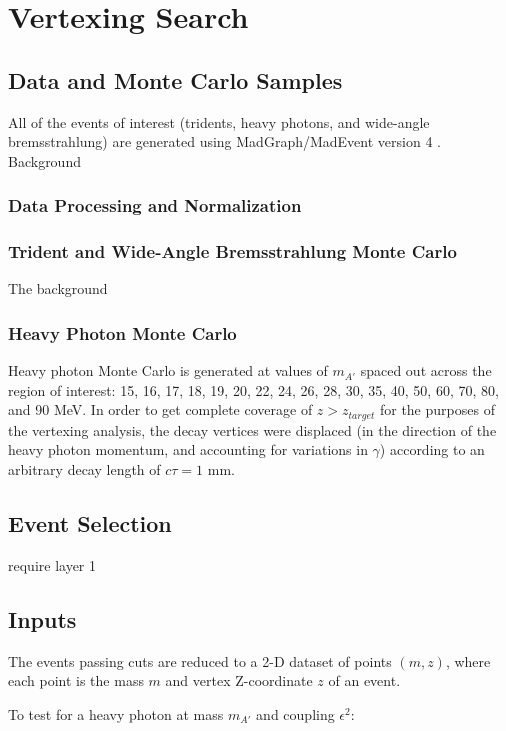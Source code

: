 \chapter{Vertexing Search}

\section{Data and Monte Carlo Samples}
All of the events of interest (tridents, heavy photons, and wide-angle bremsstrahlung) are generated using MadGraph/MadEvent version 4 \cite{alwall_madgraph_2007}.
Background

\subsection{Data Processing and Normalization}

\subsection{Trident and Wide-Angle Bremsstrahlung Monte Carlo}
The background 

\subsection{Heavy Photon Monte Carlo}
\label{sec:ap_mc}
Heavy photon Monte Carlo is generated at values of $m_{A'}$ spaced out across the region of interest: 15, 16, 17, 18, 19, 20, 22, 24, 26, 28, 30, 35, 40, 50, 60, 70, 80, and 90 MeV.
In order to get complete coverage of $z>z_{target}$ for the purposes of the vertexing analysis, the decay vertices were displaced (in the direction of the heavy photon momentum, and accounting for variations in $\gamma$) according to an arbitrary decay length of $c\tau=1$ mm.

\section{Event Selection}
require layer 1

\section{Inputs}
The events passing cuts are reduced to a 2-D dataset of points $(m,z)$, where each point is the mass $m$ and vertex Z-coordinate $z$ of an event.




To test for a heavy photon at mass $m_{A'}$ and coupling $\epsilon^2$:

